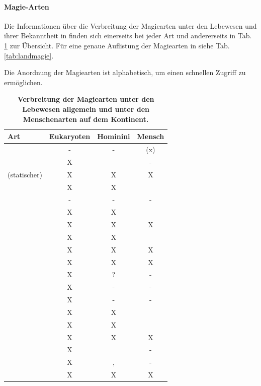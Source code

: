 \paragraph{Magie-Arten}
Die Informationen über die Verbreitung der Magiearten unter den Lebewesen und ihrer Bekanntheit in  finden sich einerseits bei jeder Art und andererseits in Tab. \ref{tab:magie-verbreitung} zur Übersicht.
Für eine genaue Auflistung der Magiearten in  siehe Tab. \ref{tab:landmagie}.

Die Anordnung der Magiearten ist alphabetisch, um einen schnellen Zugriff zu ermöglichen.

\begin{table}[htb]
	\centering
	\caption{\textbf{Verbreitung der Magiearten unter den Lebewesen allgemein und unter den Menschenarten auf dem Kontinent.}}
	\label{tab:magie-verbreitung}
	\begin{threeparttable}[\linewidth]
		\begin{tabular}{l|ccc}
			\toprule
			\textbf{Art} & \textbf{Eukaryoten} & \textbf{Hominini} & \textbf{Mensch} \\
		    \midrule
			\nameref{magie:absorption}  & - & - & (x)  \\
			\nameref{magie:bindung} & X & \nameref{rasse:sylvan} & -  \\
			(statischer) \nameref{magie:druck} & X & X & X  \\
			\nameref{magie:gleichstrom}  & X & X & \nameref{sec:mc-diplomatin}  \\
			\nameref{magie:gravitation} & - & - & - \\ \midrule[0.1px]
			\nameref{magie:hydrodynamik} & X & X &\\
			\nameref{magie:infrarot} & X & X & X \\
			\nameref{magie:licht}  & X & X & \nameref{sec:mc-spionin}  \\
			\nameref{magie:mikrowelle} & X & X & X \\
			\nameref{magie:proliferation} & X & X & X \\ \midrule[0.1px]
			\nameref{magie:quantenmechanik} & X & ? & - \\
			\nameref{magie:roentgen} & X & - & - \\
			\nameref{magie:rundfunk} & X & - & - \\
			\nameref{magie:schub} & X & X & \nameref{sec:mc-diplomatin} \\
			\nameref{magie:temperatur} & X & X & \nameref{sec:mc-soldat} \\ \midrule[0.1px]
			\nameref{magie:terahertz} & X & X & X \\
			\nameref{magie:uv} & X & \nameref{rasse:ferus} & - \\
			\nameref{magie:vibration} & X & \nameref{rasse:zwerg}, \nameref{rasse:unda} & -  \\
			\nameref{magie:wechselstrom} & X & X & X \\
			\bottomrule
		\end{tabular}
	\end{threeparttable}
\end{table}




